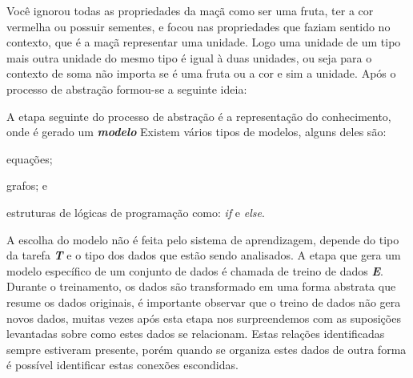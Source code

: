 \begin{figure}[ht!]
	\centering
\end{figure}

Você ignorou todas as propriedades da maçã como ser uma fruta, ter a cor vermelha  ou possuir sementes, e focou nas propriedades que faziam sentido no contexto, que é a maçã representar uma unidade. Logo uma unidade de um tipo mais outra unidade do mesmo tipo é igual à duas unidades, ou seja para o contexto de soma não importa se é uma fruta ou a cor e sim a unidade. Após o processo de abstração formou-se a seguinte ideia:


\begin{figure}[ht!]
	\centering
\end{figure}

A etapa seguinte do processo de abstração é a representação do conhecimento, onde é gerado um 
\textbf{\textit{modelo}} 
Existem vários tipos de modelos, alguns deles são:
\begin{alineas}
    \item equações;
    \item grafos; e
    \item estruturas de lógicas de programação como: \textit{if} e \textit{else}. 
\end{alineas} 

A escolha do modelo não é feita pelo sistema de aprendizagem, depende do tipo da tarefa \textbf{\textit{T}} e o tipo dos dados
que estão sendo analisados. A etapa que gera um modelo específico de um conjunto de dados é chamada de treino de dados \textbf{\textit{E}}. 
Durante o treinamento, os dados são transformado em uma forma abstrata que resume os dados originais, é importante observar que o  
treino de dados não gera novos dados, muitas vezes após esta etapa nos surpreendemos com as suposições levantadas sobre como 
estes dados se relacionam. Estas relações identificadas sempre estiveram presente, porém quando se organiza estes dados de outra forma
é possível identificar estas conexões escondidas.

